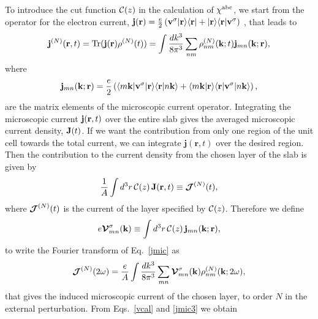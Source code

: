 \documentclass[floatfix,prb,aps,superscriptaddress,11pt,preprint,letterpaper]{revtex4}
\def\chon{black}
\begin{document}
To introduce the
cut function ${\mathbf{\cal C}}(z)$ in
the calculation of $\chi^{\mathrm{a}\mathrm{b}\mathrm{c}}$, we start from 
the operator for the electron current,
$\mathbf{j}(\mathbf{r})=\frac{e}{2}\left(\mathbf{v}^\sigma| \mathbf{r} \rangle\langle \mathbf{r} |
+| \mathbf{r} \rangle\langle \mathbf{r} |\mathbf{v}^\sigma\right)${\color{\chon} , that} leads to
\begin{align}\label{jmic}
\mathbf{j}^{(N)}(\mathbf{r},t)=\mathrm{Tr}(\mathbf{j}(\mathbf{r})\rho^{(N)}(t))
=
\int \frac{dk^3}{8\pi^3}
\sum_{nm}
\rho^{(N)}_{nm}(\mathbf{k};t)\mathbf{j}_{mn}(\mathbf{k};\mathbf{r})
,
\end{align}
where 
\begin{equation}\label{jmic3}
\mathbf{j}_{mn}(\mathbf{k};\mathbf{r})=
\frac{e}{2}
\left(
\langle m\mathbf{k} |\mathbf{v}^\sigma| \mathbf{r} \rangle\langle {\mathbf{r}} | {n\mathbf{k}} \rangle
+
\langle {m\mathbf{k}} | {\mathbf{r}} \rangle\langle \mathbf{r} |\mathbf{v}^\sigma| n\mathbf{k} \rangle
\right),
\end{equation}
are the matrix elements of the microscopic current operator.
Integrating the microscopic current $\mathbf{j}(\mathbf{r},t)$ over
the entire slab gives the averaged microscopic current density, $\mathbf{J}(t)$. 
If we want the contribution from only one region of the unit cell 
{\color{\chon} towards} the total current, we can integrate $\mathbf{j}({\mathbf r},t)$ 
over the desired region. {\color{\chon} Then the} contribution 
to the current density from the
chosen layer of the slab is given by
\begin{equation}\label{jsz}
\frac{1}{A}\int d^3r\, {\mathbf{\cal C}}(z)\, 
\mathbf{J} (\mathbf{r},t)
 \equiv \boldsymbol{\mathcal{\cal J}}^{(N)}(t),
\end{equation}
where $\boldsymbol{\mathcal{\cal J}}^{(N)}(t)$ is the current of the
layer specified by ${\mathbf{\cal C}}(z)$.
Therefore we define
\begin{equation}\label{vcal}
e{\boldsymbol{\mathcal{V}}}^{\sigma}_{mn}(\mathbf{k})
\equiv
\int d^3r\, {\mathbf{\cal C}}(z)\,\mathbf{j}_{mn}({\mathbf{k}};\mathbf{r}),
\end{equation}
to write the Fourier transform of Eq.~\eqref{jmic} as
\begin{equation}\label{jmac2}
\boldsymbol{\mathcal{\cal J}}^{(N)}(2\omega)=\frac{e}{A}
\int \frac{dk^3}{8\pi^3}
\sum_{mn}
\boldsymbol{\mathcal{\cal V}}^{\sigma}_{mn}(\mathbf{k}) 
\rho^{(N)}_{nm}(\mathbf{k};2\omega) 
, 
\end{equation}
that gives the induced microscopic current of the chosen layer, to order $N$ 
in the external perturbation. 
From
Eqs.~\eqref{vcal} and \eqref{jmic3} we obtain
\end{document}
